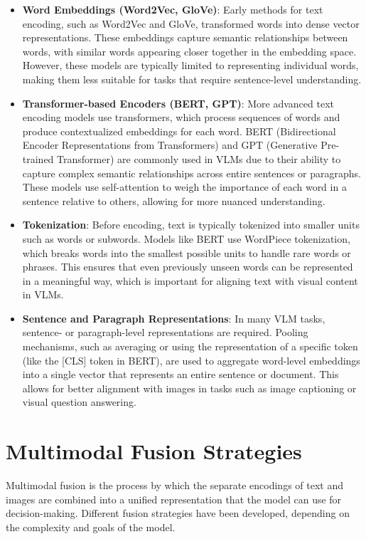 \begin{itemize}
    \item \textbf{Word Embeddings (Word2Vec, GloVe)}: Early methods for text encoding, such as Word2Vec and GloVe, transformed words into dense vector representations. These embeddings capture semantic relationships between words, with similar words appearing closer together in the embedding space. However, these models are typically limited to representing individual words, making them less suitable for tasks that require sentence-level understanding.
    \item \textbf{Transformer-based Encoders (BERT, GPT)}: More advanced text encoding models use transformers, which process sequences of words and produce contextualized embeddings for each word. BERT (Bidirectional Encoder Representations from Transformers) and GPT (Generative Pre-trained Transformer) are commonly used in VLMs due to their ability to capture complex semantic relationships across entire sentences or paragraphs. These models use self-attention to weigh the importance of each word in a sentence relative to others, allowing for more nuanced understanding.
    \item \textbf{Tokenization}: Before encoding, text is typically tokenized into smaller units such as words or subwords. Models like BERT use WordPiece tokenization, which breaks words into the smallest possible units to handle rare words or phrases. This ensures that even previously unseen words can be represented in a meaningful way, which is important for aligning text with visual content in VLMs.
    \item \textbf{Sentence and Paragraph Representations}: In many VLM tasks, sentence- or paragraph-level representations are required. Pooling mechanisms, such as averaging or using the representation of a specific token (like the [CLS] token in BERT), are used to aggregate word-level embeddings into a single vector that represents an entire sentence or document. This allows for better alignment with images in tasks such as image captioning or visual question answering.
\end{itemize}

\section{Multimodal Fusion Strategies}

Multimodal fusion is the process by which the separate encodings of text and images are combined into a unified representation that the model can use for decision-making. Different fusion strategies have been developed, depending on the complexity and goals of the model.


